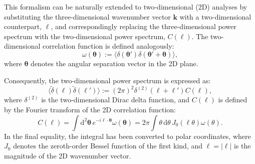 This formalism can be naturally extended to two-dimensional (2D) analyses by substituting the three-dimensional wavenumber vector $\mathbf{k}$ with a two-dimensional counterpart, $\boldsymbol{\ell}$, and correspondingly replacing the three-dimensional power spectrum with the two-dimensional power spectrum, $C(\boldsymbol{\ell})$. The two-dimensional correlation function is defined analogously:
\begin{equation}
    \omega(\boldsymbol{\theta}) := \langle \delta(\boldsymbol{\theta}') \delta(\boldsymbol{\theta}' + \boldsymbol{\theta}) \rangle,
    \label{eq:2D_correlation}
\end{equation}
where $\boldsymbol{\theta}$ denotes the angular separation vector in the 2D plane.

Consequently, the two-dimensional power spectrum is expressed as:
\begin{equation}
    \langle \tilde{\delta}(\boldsymbol{\ell}) \tilde{\delta}(\boldsymbol{\ell}') \rangle := (2\pi)^2 \delta^{(2)}(\boldsymbol{\ell} + \boldsymbol{\ell}') C(\boldsymbol{\ell}),
    \label{eq:2D_power_spectrum}
\end{equation}
where $\delta^{(2)}$ is the two-dimensional Dirac delta function, and $C(\boldsymbol{\ell})$ is defined by the Fourier transform of the 2D correlation function:
\begin{equation}
    C(\boldsymbol{\ell}) = \int \mathrm{d}^2\boldsymbol{\theta}\, e^{-i\boldsymbol{\ell} \cdot \boldsymbol{\theta}} \omega(\boldsymbol{\theta}) = 2\pi \int \theta\, \mathrm{d}\theta\, J_0(\ell \theta) \omega(\theta).
    \label{eq:2D_power_spectrum_definition}
\end{equation}
In the final equality, the integral has been converted to polar coordinates, where $J_0$ denotes the zeroth-order Bessel function of the first kind, and $\ell = |\boldsymbol{\ell}|$ is the magnitude of the 2D wavenumber vector. 

